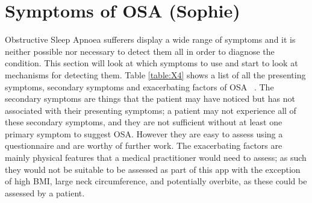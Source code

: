 \section{Symptoms of OSA (Sophie)}
\label{sec:signsAndSymptoms-sophie}
Obstructive Sleep Apnoea sufferers display a wide range of symptoms and it is neither possible nor necessary to detect them all in order to diagnose the condition. This section will look at which symptoms to use and start to look at mechanisms for detecting them. Table \ref{table:X4} shows a list of all the presenting symptoms, secondary symptoms and exacerbating factors of OSA ~\cite{epstein2009clinical,nhsmap,american2001international}. The secondary symptoms are things that the patient may have noticed but has not associated with their presenting symptoms; a patient may not experience all of these secondary symptoms, and they are not sufficient without at least one primary symptom to suggest OSA. However they are easy to assess using a questionnaire and are worthy of further work. The exacerbating factors are mainly physical features that a medical practitioner would need to assess; as such they would not be suitable to be assessed as part of this app with the exception of high BMI, large neck circumference, and potentially overbite, as these could be assessed by a patient.

